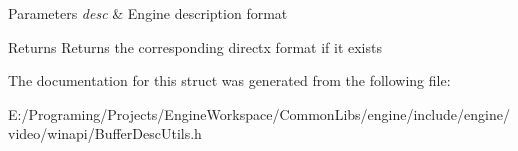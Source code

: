 \begin{DoxyParams}{Parameters}
{\em desc} & Engine description format \\
\hline
\end{DoxyParams}
\begin{DoxyReturn}{Returns}
Returns the corresponding directx format if it exists 
\end{DoxyReturn}


The documentation for this struct was generated from the following file\+:\begin{DoxyCompactItemize}
\item 
E\+:/\+Programing/\+Projects/\+Engine\+Workspace/\+Common\+Libs/engine/include/engine/video/winapi/Buffer\+Desc\+Utils.\+h\end{DoxyCompactItemize}

